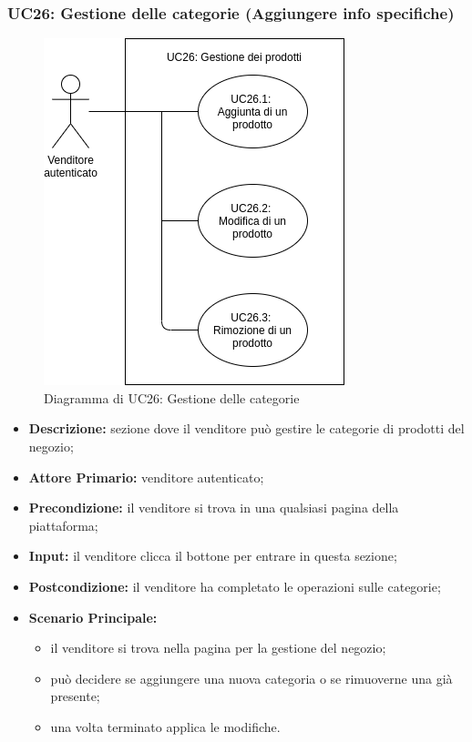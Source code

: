 \subsubsection{UC26: Gestione delle categorie (\textbf{Aggiungere info specifiche})}
\label{sec:UC26}
\begin{figure}[!ht]
    \caption{Diagramma di UC26: Gestione delle categorie}
    \vspace{10px}
    \includegraphics[scale=0.5]{../../../Images/AnalisiRequisiti/UC26}
    \centering
\end{figure}
\begin{itemize}
    \item \textbf{Descrizione:} sezione dove il venditore può gestire le categorie di prodotti del negozio;
    \item \textbf{Attore Primario:} venditore autenticato;
    \item \textbf{Precondizione:} il venditore si trova in una qualsiasi pagina della piattaforma;
    \item \textbf{Input:} il venditore clicca il bottone per entrare in questa sezione;
    \item \textbf{Postcondizione:} il venditore ha completato le operazioni sulle categorie;
    \item \textbf{Scenario Principale:}
          \begin{itemize}
              \item il venditore si trova nella pagina per la gestione del negozio;
              \item può decidere se aggiungere una nuova categoria o se rimuoverne una già presente;
              \item una volta terminato applica le modifiche.
          \end{itemize}
\end{itemize}
